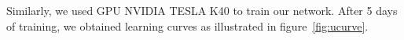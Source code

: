 %

\noindent Similarly, we used GPU NVIDIA TESLA K40 to train our network. After 5 days of training, we obtained learning curves as illustrated in figure~\ref{fig:ucurve}.

